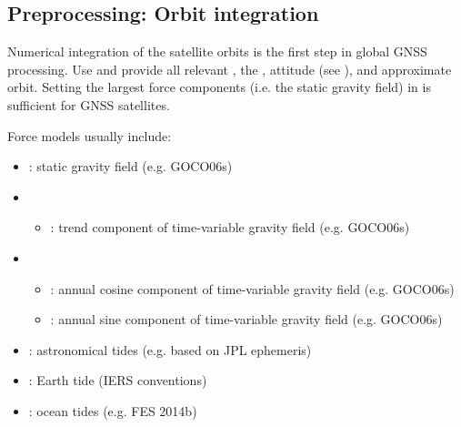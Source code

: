 \subsection{Preprocessing: Orbit integration}\label{cookbook.gnssNetwork:orbitIntegration}

Numerical integration of the satellite orbits is the first step in global GNSS processing.
Use  and provide all relevant ,
the , attitude (see ),
and approximate orbit. Setting the largest force components (i.e. the static gravity field) in
 is sufficient for GNSS satellites.

Force models usually include:
\begin{itemize}
  \item {}:
        static gravity field (e.g. GOCO06s)
  \item {}
  \begin{itemize}
    \item {}:
          trend component of time-variable gravity field (e.g. GOCO06s)
  \end{itemize}
  \item {}
  \begin{itemize}
    \item {}:
          annual cosine component of time-variable gravity field (e.g. GOCO06s)
    \item {}:
          annual sine component of time-variable gravity field (e.g. GOCO06s)
  \end{itemize}
  \item {}: astronomical tides (e.g. based on JPL ephemeris)
  \item {}: Earth tide (IERS conventions)
  \item {}: ocean tides (e.g. FES 2014b)

\end{itemize}
